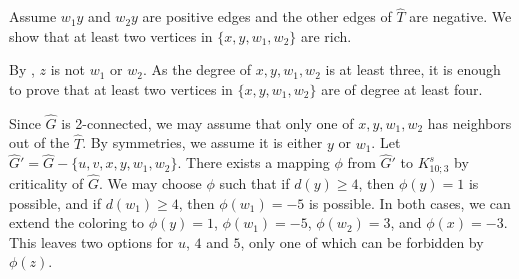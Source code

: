 \documentclass[11pt,a4paper]{article}
\makeatletter
\renewenvironment{proof}[1][\proofname]{\par
	\pushQED{\qed}%
	\normalfont \topsep6\p@\@plus6\p@\relax
	\trivlist
	\item[\hskip\labelsep
	\bfseries
	#1\@addpunct{.}]\ignorespaces
}{%
	\popQED\endtrivlist\@endpefalse
}
\theoremstyle{definition}
\makeatother
\begin{document}
\begin{proof}
	Assume $w_1y$ and $w_2y$ are positive edges and the other edges of $\widehat{T}$ are negative. We show that at least two vertices in $\{x, y,w_1,w_2\}$ are rich.
	
	By , $z$ is not $w_1$ or $w_2$. As the degree of $x, y, w_1, w_2$ is at least three, it is enough to prove that at least two vertices in $\{x, y,w_1,w_2\}$ are of degree  at least four. 
	
	Since $\widehat{G}$ is 2-connected, we may assume that only one of $x, y, w_1, w_2$ has neighbors out of the $\widehat{T}$. By symmetries, we assume it is either $y$ or $w_1$. Let $\widehat{G}'=\widehat{G}-\{u,v,x, y, w_1,w_2\}$. There exists a mapping $\phi$ from $\widehat{G}'$ to $K_{10;3}^s$ by criticality of $\widehat{G}$. We may choose $\phi$ such that if $d(y)\ge 4$, then $\phi(y)=1$ is possible, and if $d(w_1)\ge 4$, then $\phi(w_1)=-5$ is possible. In both cases, we can extend the coloring to $\phi(y)=1$, $\phi(w_1)=-5$, $\phi(w_2)=3$, and $\phi(x)=-3$. This leaves two options for $u$, $4$ and $5$, only one of which can be forbidden by $\phi(z)$.  
\end{proof}
\end{document}
